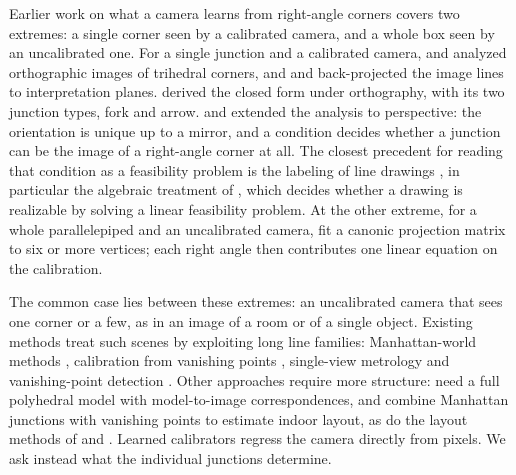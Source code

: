 \documentclass[pdflatex,sn-mathphys-num,iicol]{sn-jnl}
\theoremstyle{thmstyleone}
\theoremstyle{thmstylethree}
\theoremstyle{thmstyletwo}
\begin{document}
Earlier work on what a camera learns from right-angle corners covers two extremes: a single corner seen by a calibrated camera, and a whole box seen by an uncalibrated one. For a single junction and a calibrated camera, \citet{perkins1968} and \citet{kanade1980} analyzed orthographic images of trihedral corners, and \citet{barnard1983} and \citet{horaud1987} back-projected the image lines to interpretation planes. \citet{kanatani1986} derived the closed form under orthography, with its two junction types, fork and arrow. \citet{kanatani1988} and \citet{shakunaga1986,shakunaga1989} extended the analysis to perspective: the orientation is unique up to a mirror, and a condition decides whether a junction can be the image of a right-angle corner at all. The closest precedent for reading that condition as a feasibility problem is the labeling of line drawings \citep{huffman1971,clowes1971}, in particular the algebraic treatment of \citet{sugihara1986}, which decides whether a drawing is realizable by solving a linear feasibility problem. At the other extreme, for a whole parallelepiped and an uncalibrated camera, \citet{wilczkowiak2001,wilczkowiak2002,wilczkowiak2005} fit a canonic projection matrix to six or more vertices; each right angle then contributes one linear equation on the calibration.

The common case lies between these extremes: an uncalibrated camera that sees one corner or a few, as in an image of a room or of a single object. Existing methods treat such scenes by exploiting long line families: Manhattan-world methods \citep{coughlan1999,schindler2004}, calibration from vanishing points \citep{caprile1990,cipolla1999,kosecka2002,wildenauer2012}, single-view metrology \citep{criminisi2000} and vanishing-point detection \citep{tardif2009}. Other approaches require more structure: \citet{jelinek2001} need a full polyhedral model with model-to-image correspondences, and \citet{ramalingam2013} combine Manhattan junctions with vanishing points to estimate indoor layout, as do the layout methods of \citet{hedau2009} and \citet{lee2009}. Learned calibrators \citep{workman2015,holdgeoffroy2018,jin2023,veicht2024} regress the camera directly from pixels. We ask instead what the individual junctions determine.
\end{document}

